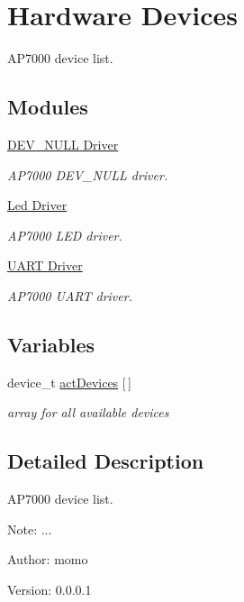 \hypertarget{group__ap7000__hardware__devices}{
\section{Hardware Devices}
\label{group__ap7000__hardware__devices}
}
AP7000 device list.  


\subsection*{Modules}
\begin{CompactItemize}
\item 
\hyperlink{group___d_e_v___n_u_l_l___d_r_i_v_e_r}{DEV\_\-NULL Driver}
\begin{CompactList}\small\item\em AP7000 DEV\_\-NULL driver. \item\end{CompactList}

\item 
\hyperlink{group___l_e_d___d_r_i_v_e_r}{Led Driver}
\begin{CompactList}\small\item\em AP7000 LED driver. \item\end{CompactList}

\item 
\hyperlink{group___u_a_r_t___d_r_i_v_e_r}{UART Driver}
\begin{CompactList}\small\item\em AP7000 UART driver. \item\end{CompactList}

\end{CompactItemize}
\subsection*{Variables}
\begin{CompactItemize}
\item 
\hypertarget{group__ap7000__hardware__devices_ga20a83acab6e9ba5c69b47092a295521}{
device\_\-t \hyperlink{group__ap7000__hardware__devices_ga20a83acab6e9ba5c69b47092a295521}{actDevices} \mbox{[}$\,$\mbox{]}}
\label{group__ap7000__hardware__devices_ga20a83acab6e9ba5c69b47092a295521}

\begin{CompactList}\small\item\em array for all available devices \item\end{CompactList}\end{CompactItemize}


\subsection{Detailed Description}
AP7000 device list. 

\begin{Desc}
\item[Note:]... \end{Desc}
\begin{Desc}
\item[Author:]momo \end{Desc}
\begin{Desc}
\item[Version:]0.0.0.1 \end{Desc}
